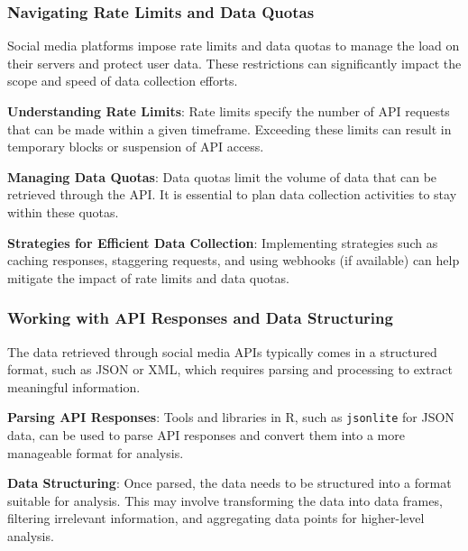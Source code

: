 \documentclass[
]{book}
\begin{document}
\hypertarget{navigating-rate-limits-and-data-quotas}{%
\subsubsection*{Navigating Rate Limits and Data Quotas}\label{navigating-rate-limits-and-data-quotas}}

Social media platforms impose rate limits and data quotas to manage the load on their servers and protect user data. These restrictions can significantly impact the scope and speed of data collection efforts.

\textbf{Understanding Rate Limits}: Rate limits specify the number of API requests that can be made within a given timeframe. Exceeding these limits can result in temporary blocks or suspension of API access.

\textbf{Managing Data Quotas}: Data quotas limit the volume of data that can be retrieved through the API. It is essential to plan data collection activities to stay within these quotas.

\textbf{Strategies for Efficient Data Collection}: Implementing strategies such as caching responses, staggering requests, and using webhooks (if available) can help mitigate the impact of rate limits and data quotas.

\hypertarget{working-with-api-responses-and-data-structuring}{%
\subsubsection*{Working with API Responses and Data Structuring}\label{working-with-api-responses-and-data-structuring}}

The data retrieved through social media APIs typically comes in a structured format, such as JSON or XML, which requires parsing and processing to extract meaningful information.

\textbf{Parsing API Responses}: Tools and libraries in R, such as \texttt{jsonlite} for JSON data, can be used to parse API responses and convert them into a more manageable format for analysis.

\textbf{Data Structuring}: Once parsed, the data needs to be structured into a format suitable for analysis. This may involve transforming the data into data frames, filtering irrelevant information, and aggregating data points for higher-level analysis.
\end{document}
